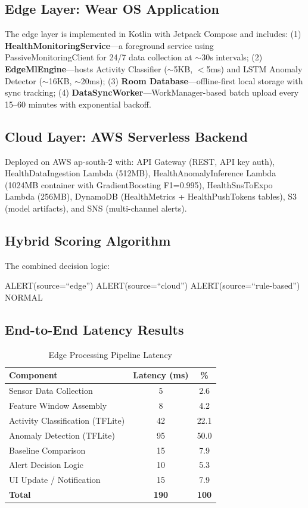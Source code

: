 \subsection{Edge Layer: Wear OS Application}
The edge layer is implemented in Kotlin with Jetpack Compose and includes: (1) \textbf{HealthMonitoringService}---a foreground service using PassiveMonitoringClient for 24/7 data collection at $\sim$30s intervals; (2) \textbf{EdgeMlEngine}---hosts Activity Classifier ($\sim$5KB, $<$5ms) and LSTM Anomaly Detector ($\sim$16KB, $\sim$20ms); (3) \textbf{Room Database}---offline-first local storage with sync tracking; (4) \textbf{DataSyncWorker}---WorkManager-based batch upload every 15--60 minutes with exponential backoff.

\subsection{Cloud Layer: AWS Serverless Backend}
Deployed on AWS ap-south-2 with: API Gateway (REST, API key auth), HealthDataIngestion Lambda (512MB), HealthAnomalyInference Lambda (1024MB container with GradientBoosting F1=0.995), HealthSnsToExpo Lambda (256MB), DynamoDB (HealthMetrics + HealthPushTokens tables), S3 (model artifacts), and SNS (multi-channel alerts).

\subsection{Hybrid Scoring Algorithm}
The combined decision logic:
\begin{algorithmic}
    \STATE ALERT(source=``edge'')
    \STATE ALERT(source=``cloud'')
    \STATE ALERT(source=``rule-based'')
\ELSE
    \STATE NORMAL
\ENDIF
\end{algorithmic}

\subsection{End-to-End Latency Results}

\begin{table}[H]
\centering
\caption{Edge Processing Pipeline Latency}
\label{tab:latency}
\begin{tabular}{lcc}
\toprule
\textbf{Component} & \textbf{Latency (ms)} & \textbf{\%} \\
\midrule
Sensor Data Collection & 5 & 2.6 \\
Feature Window Assembly & 8 & 4.2 \\
Activity Classification (TFLite) & 42 & 22.1 \\
Anomaly Detection (TFLite) & 95 & 50.0 \\
Baseline Comparison & 15 & 7.9 \\
Alert Decision Logic & 10 & 5.3 \\
UI Update / Notification & 15 & 7.9 \\
\midrule
\textbf{Total} & \textbf{190} & \textbf{100} \\
\bottomrule
\end{tabular}
\end{table}

